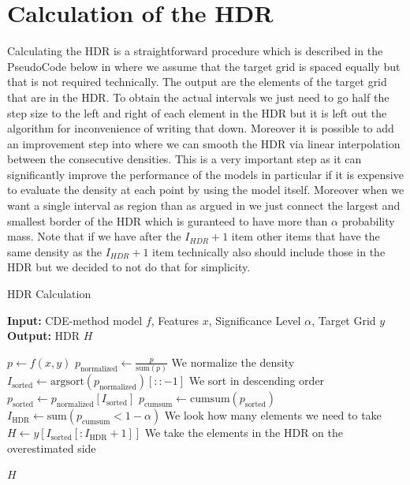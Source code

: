 \section{Calculation of the HDR}

Calculating the HDR is a straightforward procedure which is described in the PseudoCode below in  where we assume that the target grid is spaced equally but that is not required technically. The output are the elements of the target grid that are in the HDR. To obtain the actual intervals we just need to go half the step size to the left and right of each element in the HDR but it is left out the algorithm for inconvenience of writing that down. Moreover it is possible to add an improvement step into  where we can smooth the HDR via linear interpolation between the consecutive densities. This is a very important step as it can significantly improve the performance of the models in particular if it is expensive to evaluate the density at each point by using the model itself. Moreover when we want a single interval as region than as argued in  we just connect the largest and smallest border of the HDR which is guranteed to have more than $\alpha$ probability mass. Note that if we have after the $I_{HDR} + 1$ item other items that have the same density as the $I_{HDR} + 1$ item technically also should include those in the HDR but we decided to not do that for simplicity.

\begin{algorithm}
    \caption{HDR Calculation}
    \label{alg:hdr}
    \begin{algorithmic}
        \STATE \textbf{Input:} CDE-method model $f$, Features $x$, Significance Level $\alpha$, Target Grid $y$
        \STATE \textbf{Output:} HDR $H$
        
        \STATE $p \leftarrow f(x, y)$
        \STATE $p_{\text{normalized}} \leftarrow \frac{p}{\text{sum}(p)}$ We normalize the density
        \STATE $I_{\text{sorted}} \leftarrow \text{argsort}(p_{\text{normalized}})[::-1]$ We sort in descending order
        \STATE $p_{\text{sorted}} \leftarrow p_{\text{normalized}}[I_{\text{sorted}}]$
        \STATE $p_{\text{cumsum}} \leftarrow \text{cumsum}(p_{\text{sorted}})$ 
        \STATE $I_{\text{HDR}} \leftarrow \text{sum}(p_{\text{cumsum}} < 1 - \alpha)$ We look how many elements we need to take 
        \STATE $H \leftarrow y[I_{\text{sorted}}[:I_{\text{HDR}} + 1]]$ We take the elements in the HDR on the overestimated side

        \RETURN $H$
    \end{algorithmic}
\end{algorithm}

